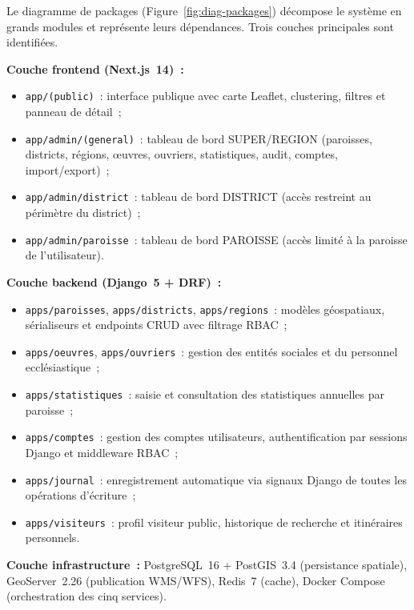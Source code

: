 \documentclass[12pt, a4paper]{report}
\begin{document}
Le diagramme de packages (Figure~\ref{fig:diag-packages}) décompose le système
en grands modules et représente leurs dépendances. Trois couches principales
sont identifiées.

\noindent\textbf{Couche frontend (Next.js~14)~:}
\begin{itemize}[itemsep=2pt, topsep=3pt, leftmargin=1.5cm]
  \item \texttt{app/(public)}~: interface publique avec carte Leaflet, clustering,
    filtres et panneau de détail~;
  \item \texttt{app/admin/(general)}~: tableau de bord SUPER/REGION (paroisses,
    districts, régions, œuvres, ouvriers, statistiques, audit, comptes,
    import/export)~;
  \item \texttt{app/admin/district}~: tableau de bord DISTRICT (accès restreint
    au périmètre du district)~;
  \item \texttt{app/admin/paroisse}~: tableau de bord PAROISSE (accès limité à
    la paroisse de l'utilisateur).
\end{itemize}

\noindent\textbf{Couche backend (Django~5 + DRF)~:}
\begin{itemize}[itemsep=2pt, topsep=3pt, leftmargin=1.5cm]
  \item \texttt{apps/paroisses}, \texttt{apps/districts}, \texttt{apps/regions}~:
    modèles géospatiaux, sérialiseurs et endpoints CRUD avec filtrage RBAC~;
  \item \texttt{apps/oeuvres}, \texttt{apps/ouvriers}~: gestion des entités
    sociales et du personnel ecclésiastique~;
  \item \texttt{apps/statistiques}~: saisie et consultation des statistiques
    annuelles par paroisse~;
  \item \texttt{apps/comptes}~: gestion des comptes utilisateurs, authentification
    par sessions Django et middleware RBAC~;
  \item \texttt{apps/journal}~: enregistrement automatique via signaux Django
    de toutes les opérations d'écriture~;
  \item \texttt{apps/visiteurs}~: profil visiteur public, historique de
    recherche et itinéraires personnels.
\end{itemize}

\noindent\textbf{Couche infrastructure~:} PostgreSQL~16 + PostGIS~3.4 (persistance
spatiale), GeoServer~2.26 (publication WMS/WFS), Redis~7 (cache), Docker Compose
(orchestration des cinq services).
\end{document}
